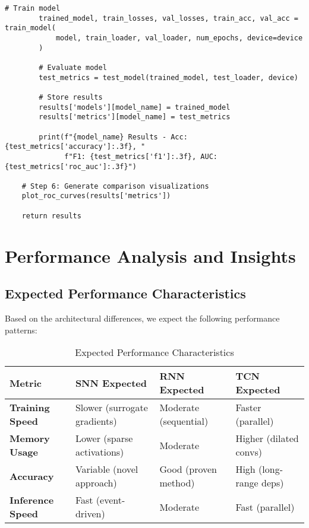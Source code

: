 \documentclass[12pt,a4paper]{article}
\begin{document}
\begin{lstlisting}[caption={Complete Pipeline Implementation - System Orchestrator Function}]
        # Train model
        trained_model, train_losses, val_losses, train_acc, val_acc = train_model(
            model, train_loader, val_loader, num_epochs, device=device
        )
        
        # Evaluate model
        test_metrics = test_model(trained_model, test_loader, device)
        
        # Store results
        results['models'][model_name] = trained_model
        results['metrics'][model_name] = test_metrics
        
        print(f"{model_name} Results - Acc: {test_metrics['accuracy']:.3f}, "
              f"F1: {test_metrics['f1']:.3f}, AUC: {test_metrics['roc_auc']:.3f}")
    
    # Step 6: Generate comparison visualizations
    plot_roc_curves(results['metrics'])
    
    return results
\end{lstlisting}

\section{Performance Analysis and Insights}

\subsection{Expected Performance Characteristics}

Based on the architectural differences, we expect the following performance patterns:

\begin{table}[H]
\centering
\begin{tabular}{|l|p{3cm}|p{3cm}|p{3cm}|}
\hline
\textbf{Metric} & \textbf{SNN Expected} & \textbf{RNN Expected} & \textbf{TCN Expected} \\
\hline
\textbf{Training Speed} & Slower (surrogate gradients) & Moderate (sequential) & Faster (parallel) \\
\hline
\textbf{Memory Usage} & Lower (sparse activations) & Moderate & Higher (dilated convs) \\
\hline
\textbf{Accuracy} & Variable (novel approach) & Good (proven method) & High (long-range deps) \\
\hline
\textbf{Inference Speed} & Fast (event-driven) & Moderate & Fast (parallel) \\
\hline
\end{tabular}
\caption{Expected Performance Characteristics}
\end{table}
\end{document}
